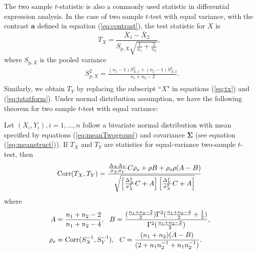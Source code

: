 	The two sample $t$-statistic is also a commonly used statistic in differential expression 
	analysis.	In the case of two sample $t$-test with equal variance, with the contrast $\bm a$ 
	defined in equation (\ref{eq:contrast}), the test statistic for $X$ is 
	\begin{equation}\label{eq:tx}
	T_X= \frac{\bar{X}_1- \bar{X}_2}{S_{p, X}\sqrt{\frac{1}{n_1} + \frac{1}{n_2}}},
	\end{equation}
	where $S_{p, X}$ is the pooled variance
	\begin{equation}\label{eq:tstatform}
	\begin{aligned}
	&S_{p, X}^2 = \frac{(n_1-1)S_{X, 1}^2 + (n_2 -1)S_{X,2}^2}{n_1 + n_2 -2}. \\
	\end{aligned}
	\end{equation}
	Similarly, we obtain $T_Y$ by replacing the subscript ``$X$" in equations (\ref{eq:tx}) and 
	(\ref{eq:tstatform}). Under normal distribution assumption, we have the following theorem for 
	two sample $t$-test with equal variance:
	\begin{theorem}\label{thm:tstat}
		Let $(X_i, Y_i), i = 1, \ldots, n$ follow a bivariate normal distribution with mean 
		specified by equations (\ref{eq:meanTwogroup}) and covariance $\bm \Sigma$ (see equation 
		(\ref{eq:meanstruct})). If $T_X$ and $T_Y$ are statistics for equal-variance two-sample 
		$t$-test, then 
		\begin{equation}\label{eq:ttestcor}
		\begin{aligned}
		\text{Corr}(T_X, T_Y) =   
		\frac{\frac{\Delta_X\Delta_Y}{\sigma_X\sigma_Y}C \rho_{s}+ \rho B
			+ \rho_{s}\rho(A-B)}{\sqrt{\left[ \frac{\Delta_X^2}{\sigma_X^2}C + 
			A\right]\left[\frac{\Delta_Y^2}{\sigma_X^2}C +   A\right]}}
		\end{aligned}
		\end{equation}
		where 
		\begin{equation}\label{eq:AandB}
		\begin{aligned}
		A & = \frac{n_1 + n_2-2}{n_1 + n_2-4}, ~~B =
		\frac{(\frac{n_1 + n_2 -2}{2})\Gamma^2(\frac{n_1 + n_2 -4}{2} + 
		\frac{1}{2})}{\Gamma^2(\frac{n_1+ n_2 -2}{2})}, \\
		\rho_s & = \text{Corr}(S_X^{-1}, S_Y^{-1}), ~~ 
		C = \frac{(n_1 + n_2)(A-B)}{(2 + n_1n_2^{-1} + n_1n_2^{-1})}.
		\end{aligned}
		\end{equation}	 
	\end{theorem}

